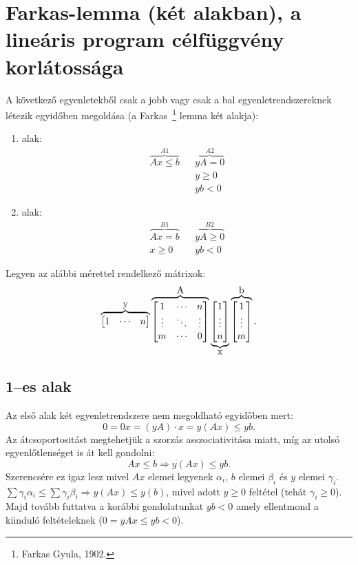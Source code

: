\skiptooddpage
\section{Farkas-lemma (két alakban), a lineáris program célfüggvény korlátossága}

A következő egyenletekből csak a jobb vagy csak a bal egyenletrendszereknek
létezik egyidőben megoldása (a Farkas~\footnote{Farkas Gyula, 1902.} lemma két
alakja):

\begin{enumerate}
  \item alak: \begin{align*}
  \overbrace{Ax \leq b}^{A1}  && \overbrace{yA= 0}^{A2}\\
   			 && y\geq 0 \\
             && yb< 0
  \end{align*}
  \item alak:\begin{align*}
  \overbrace{Ax = b }^{B1}   && \overbrace{yA \geq 0}^{B2}\\
  x \geq 0 && yb < 0 
  \end{align*}
\end{enumerate}

Legyen az alábbi mérettel rendelkező mátrixok:
\[
\overbrace{\begin{bmatrix} 1 &  \cdots &  n \end{bmatrix}}^{\hbox{y}} 
\overbrace{\begin{bmatrix} 1 & \cdots & n \\ \vdots & \ddots & \vdots \\ m  & \cdots & 0 \end{bmatrix}}^{\hbox{A}}
\underbrace{\begin{bmatrix} 1 \\ \vdots \\  n \end{bmatrix}}_{\hbox{x}}
\overbrace{\begin{bmatrix} 1 \\ \vdots \\  m \end{bmatrix}}^{\hbox{b}}.
\]

\subsection{1--es alak}
Az első alak két egyenletrendszere nem megoldható egyidőben mert:
\[ 0 = 0x = (yA) \cdot x = y(Ax) \leq yb.\] Az átcsoportositást megtehetjük a
szorzás asszociativitása miatt, míg az utolsó egyenlőtlenséget is át kell
gondolni: \[ Ax \leq b \Rightarrow y(Ax) \leq yb.\] Szerencsére ez igaz lesz
mivel $Ax$ elemei legyenek $\alpha_i$, $b$ elemei $\beta_i$ és $y$ elemei
$\gamma_i$.
$\sum\gamma_i \alpha_i \leq \sum \gamma_i \beta_i \Rightarrow y(Ax) \leq y(b)$,
mivel adott $y \geq 0$ feltétel (tehát $\gamma_i \geq 0$). Majd tovább futtatva a
korábbi gondolatunkat $yb<0$ amely ellentmond a kiinduló feltételeknek ($0=yAx \leq yb<0$). 

